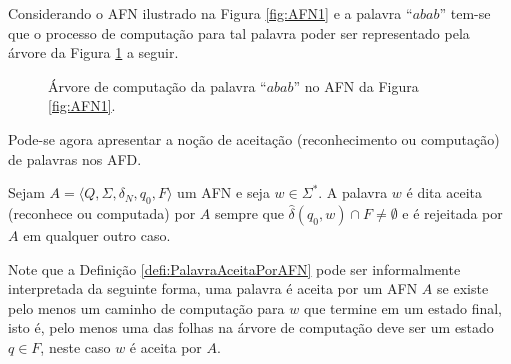 \begin{exem}\label{exe:ArvoreComputacaoAFN}
	Considerando o AFN ilustrado na Figura \ref{fig:AFN1} e a palavra ``$abab$'' tem-se que o processo de computação para tal palavra poder ser representado pela árvore da Figura \ref{fig:ArvoreComputacaoAFN} a seguir.
	
	\begin{figure}[h]
		\centering
		\caption{Árvore de computação da palavra ``$abab$'' no AFN da Figura \ref{fig:AFN1}.}
		\label{fig:ArvoreComputacaoAFN}
	\end{figure}
\end{exem}

Pode-se agora apresentar a noção de aceitação (reconhecimento ou computação) de palavras nos AFD.

\begin{definition}\label{defi:PalavraAceitaPorAFN}
	Sejam $A = \langle Q, \Sigma, \delta_N, q_0, F\rangle$ um AFN e seja $w \in \Sigma^*$. A palavra $w$ é dita aceita (reconhece ou computada) por $A$ sempre que $\widehat{\delta}(q_0, w) \cap F \neq \emptyset$ e é rejeitada por $A$ em qualquer outro caso.
\end{definition}

Note que a Definição \ref{defi:PalavraAceitaPorAFN} pode ser informalmente interpretada da seguinte forma, uma palavra é aceita por um AFN $A$ se existe pelo menos um caminho de computação para $w$ que termine em um estado final, isto é, pelo menos uma das folhas na árvore de computação deve ser um estado $q \in F$, neste caso $w$ é aceita por $A$.

